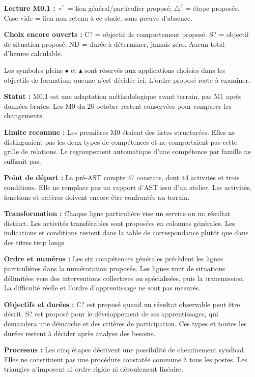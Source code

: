 \documentclass[9pt,a4paper,landscape]{extarticle}
\begin{document}
{\footnotesize \textbf{Lecture M0.1 :} $\circ^{?}$ = lien général/particulier proposé; $\triangle^{?}$ = étape proposée. Case vide = lien non retenu à ce stade, sans preuve d’absence.\par \textbf{Choix encore ouverts :} C? = objectif de comportement proposé; S? = objectif de situation proposé; ND = durée à déterminer, jamais zéro. Aucun total d’heures calculable.\par Les symboles pleins $\bullet$ et $\blacktriangle$ sont réservés aux applications choisies dans les objectifs de formation; aucune n’est décidée ici. L’ordre proposé reste à examiner.}
\par
\textbf{Statut :} M0.1 est une adaptation méthodologique avant terrain, pas M1 après données brutes. Les M0 du 26 octobre restent conservées pour comparer les changements.\par
\textbf{Limite reconnue :} Les premières M0 étaient des listes structurées. Elles ne distinguaient pas les deux types de compétences et ne comportaient pas cette grille de relations. Le regroupement automatique d’une compétence par famille ne suffisait pas.\par
\textbf{Point de départ :} La pré-AST compte 47 constats, dont 44 activités et trois conditions. Elle ne remplace pas un rapport d’AST issu d’un atelier. Les activités, fonctions et critères doivent encore être confrontés au terrain.\par
\textbf{Transformation :} Chaque ligne particulière vise un service ou un résultat distinct. Les activités transférables sont proposées en colonnes générales. Les indications et conditions restent dans la table de correspondance plutôt que dans des titres trop longs.\par
\textbf{Ordre et numéros :} Les six compétences générales précèdent les lignes particulières dans la numérotation proposée. Les lignes vont de situations délimitées vers des interventions collectives ou spécialisées, puis la transmission. La difficulté réelle et l’ordre d’apprentissage ne sont pas mesurés.\par
\textbf{Objectifs et durées :} C? est proposé quand un résultat observable peut être décrit. S? est proposé pour le développement de ses apprentissages, qui demandera une démarche et des critères de participation. Ces types et toutes les durées restent à décider après analyse des besoins.\par
\textbf{Processus :} Les cinq étapes décrivent une possibilité de cheminement syndical. Elles ne constituent pas une procédure constatée commune à tous les postes. Les triangles n’imposent ni ordre rigide ni déroulement linéaire.\par
\end{document}
